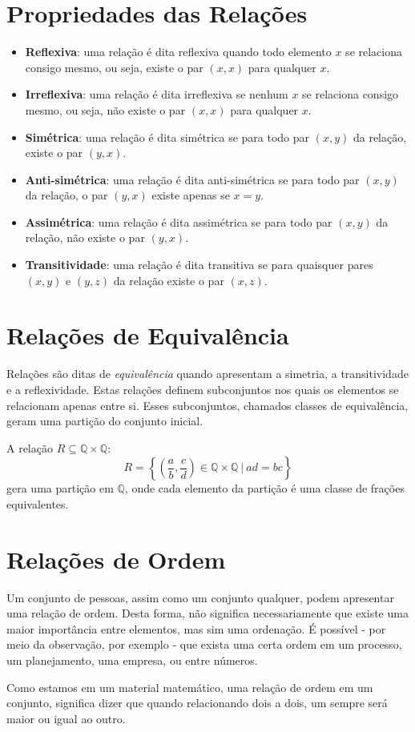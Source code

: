 \section{Propriedades das Relações}
\begin{itemize}
	\item \textbf{Reflexiva}: uma relação é dita reflexiva quando todo elemento $x$ se relaciona consigo mesmo, ou seja, existe o par $(x,x)$ para qualquer $x$.
	\item \textbf{Irreflexiva}: uma relação é dita irreflexiva se nenhum $x$ se relaciona consigo mesmo, ou seja, não existe o par $(x,x)$ para qualquer $x$.
	\item \textbf{Simétrica}: uma relação é dita simétrica se para todo par $(x,y)$ da relação, existe o par $(y,x)$.
	\item \textbf{Anti-simétrica}: uma relação é dita anti-simétrica se para todo par $(x,y)$ da relação, o par $(y,x)$ existe apenas se $x=y$.
\item \textbf{Assimétrica}: uma relação é dita assimétrica se para todo par $(x,y)$ da relação, não existe o par $(y,x)$.
	\item \textbf{Transitividade}: uma relação é dita transitiva se para quaisquer pares $(x,y)$ e $(y,z)$ da relação existe o par $(x,z)$.
\end{itemize}

\section{Relações de Equivalência}
Relações são ditas de \emph{equivalência} quando apresentam a simetria, a transitividade e a reflexividade. Estas relações definem subconjuntos nos quais os elementos se relacionam apenas entre si. Esses subconjuntos, chamados classes de equivalência, geram uma partição do conjunto inicial.
\begin{exemplo}
A relação $R \subseteq \mathbb{Q} \times \mathbb{Q}$: \[R = \left\lbrace(\frac{a}{b},\frac{c}{d}) \in \mathbb{Q} \times \mathbb{Q} \: | \: ad=bc\right\rbrace\] gera uma partição em $\mathbb{Q}$, onde cada elemento da partição é uma classe de frações equivalentes.
\end{exemplo}

\section{Relações de Ordem}
Um conjunto de pessoas, assim como um conjunto qualquer, podem apresentar uma relação de ordem. Desta forma, não significa necessariamente que existe uma maior importância entre elementos, mas sim uma ordenação. É possível - por meio da observação, por exemplo - que exista uma certa ordem em um processo, um planejamento, uma empresa, ou entre números.\par 
Como estamos em um material matemático, uma relação de ordem em um conjunto, significa dizer que quando relacionando dois a dois, um sempre será maior ou igual ao outro.

